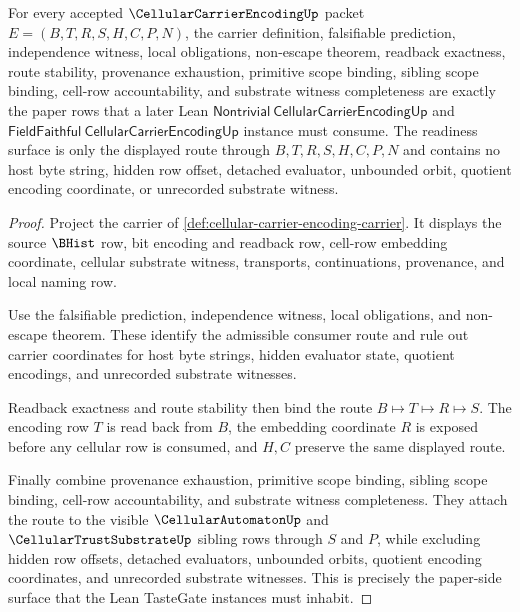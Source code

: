 \begin{theorem}
\label{thm:cellular-carrier-encoding-tastegate-readiness-surface}
For every accepted $\CellularCarrierEncodingUp$ packet $E=(B,T,R,S,H,C,P,N)$, the carrier definition, falsifiable prediction, independence witness, local \NameCert{} obligations, non-escape theorem, readback exactness, route stability, provenance exhaustion, primitive scope binding, sibling scope binding, cell-row accountability, and substrate witness completeness are exactly the paper rows that a later Lean $\mathsf{Nontrivial}\ \mathsf{CellularCarrierEncodingUp}$ and $\mathsf{FieldFaithful}\ \mathsf{CellularCarrierEncodingUp}$ instance must consume. The readiness surface is only the displayed route through $B,T,R,S,H,C,P,N$ and contains no host byte string, hidden row offset, detached evaluator, unbounded orbit, quotient encoding coordinate, or unrecorded substrate witness.
\end{theorem}
\begin{proof}
Project the carrier of \autoref{def:cellular-carrier-encoding-carrier}. It displays the source $\BHist$ row, bit encoding and readback row, cell-row embedding coordinate, cellular substrate witness, transports, continuations, provenance, and local naming row.

Use the falsifiable prediction, independence witness, local \NameCert{} obligations, and non-escape theorem. These identify the admissible consumer route and rule out carrier coordinates for host byte strings, hidden evaluator state, quotient encodings, and unrecorded substrate witnesses.

Readback exactness and route stability then bind the route $B \longmapsto T \longmapsto R \longmapsto S$. The encoding row $T$ is read back from $B$, the embedding coordinate $R$ is exposed before any cellular row is consumed, and $H,C$ preserve the same displayed route.

Finally combine provenance exhaustion, primitive scope binding, sibling scope binding, cell-row accountability, and substrate witness completeness. They attach the route to the visible $\CellularAutomatonUp$ and $\CellularTrustSubstrateUp$ sibling rows through $S$ and $P$, while excluding hidden row offsets, detached evaluators, unbounded orbits, quotient encoding coordinates, and unrecorded substrate witnesses. This is precisely the paper-side surface that the Lean TasteGate instances must inhabit.
\end{proof}

